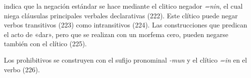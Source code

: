 \textcolor{MidnightBlue}{\citet{vaisser}} indica que la negación estándar se hace mediante el clitico negador {\setmainfont{Charis SIL} \textit{=nin}}, el cual niega cláusulas principales verbales declarativas (222). Este clítico puede negar verbos transitivos (223) como intransitivos (224). Las construcciones que predican el acto de «dar», pero que se realizan con un morfema cero, pueden negarse también con el clítico (225).

Los prohibitivos se construyen con el sufijo pronominal {\setmainfont{Charis SIL} \textit{-mun}} y el clítico {\setmainfont{Charis SIL} \textit{=in}} en el verbo (226).